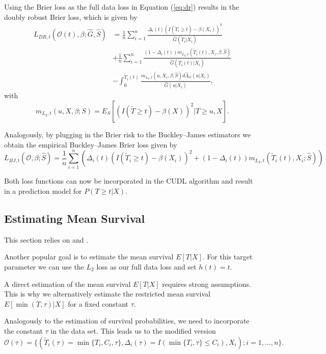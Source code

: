 \documentclass[12pt, a4paper]{scrartcl}
\theoremstyle{definition}
\theoremstyle{plain}
\numberwithin{equation}{section}
\numberwithin{figure}{section}
\numberwithin{table}{section}
\begin{document}
	Using the Brier loss as the full data loss in Equation (\ref{eq:dr}) results in the doubly robust Brier loss, which is given by
	\begin{equation*}
	\begin{split}
		L_{DR, t}(\mathcal{O}(t),\beta; \hat{G},\hat{S}) &={}  \frac{1}{n} \sum_{i=1}^n \frac{\Delta_i(t)(I(\tilde{T}_i \geq t)-\beta(X_i))^2}{\hat{G}(\tilde{T}_i \vert X_i)}\\
		& + \frac{1}{n} \sum_{i=1}^n \frac{(1-\Delta_i(t))m_{L_2,t}(\tilde{T}_i(t),X_i,\beta; \hat{S})}{\hat{G}(\tilde{T}_i(t) \vert X_i)}\\
		& - \int_{0}^{\tilde{T}_i(t)} \frac{m_{L_2,t}(u,X_i,\beta; \hat{S})d\hat{\Lambda}_G(u\vert X_i)}{\hat{G}(u \vert X_i)},
	\end{split}
	\end{equation*}
	 with
	 \begin{equation*}
	 	m_{L_2,t}(u,X,\beta;S) = E_S[(I(\tilde{T}\geq t)-\beta(X))^2 \vert T \geq u, X].
	 \end{equation*}
	
	Analogously, by plugging in the Brier risk to the Buckley--James estimators we obtain the empirical Buckley--James Brier loss given by
	\begin{equation*}
		L_{BJ,t}(\mathcal{O},\beta; \hat{S}) = \frac{1}{n} \sum_{i=1}^n \left( \Delta_i(t)(I(\tilde{T}_i\geq t)-\beta(X_i))^2 + (1- \Delta_i(t))m_{L_2,t}(\tilde{T}_i(t), X_i; \hat{S})\right)
	\end{equation*}
	
	Both loss functions can now be incorporated in the CUDL algorithm and result in a prediction model for $P(T\geq t\vert X)$.

	\subsection{Estimating Mean Survival}
	
	This section relies on \citet*{basearticle} and \citet*{strawderman}.
	
	Another popular goal is to estimate the mean survival $E[T\vert X]$.
	For this target parameter we can use the $L_2$ loss as our full data loss and set $h(t)=t$.

	A direct estimation of the mean survival $E[T\vert X]$ requires strong assumptions.
	This is why we alternatively estimate the restricted mean survival $E[\min(T, \tau)\vert X]$ for a fixed constant $\tau$.
	
	Analogously to the estimation of survival probabilities, we need to incorporate the constant $\tau$ in the data set.
	This leads us to the modified version	
	\begin{equation*}
		\mathcal{O}(\tau) = \{(\tilde{T}_i(\tau) = \min\{T_i, C_i, \tau\}, \Delta_i(\tau) = I(\min\{T_i, \tau\}\leq C_i), X_i); i = 1, \dots , n\}.
	\end{equation*}
	
\end{document}
